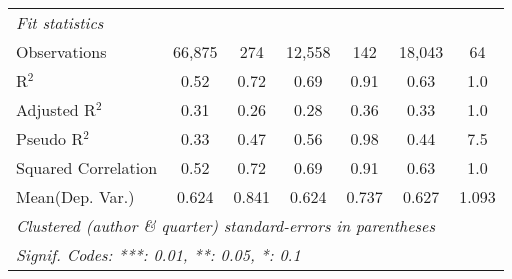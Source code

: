 \begin{tabular}{lcccccc}
   \midrule
   \emph{Fit statistics}\\
   Observations                                               & 66,875        & 274           & 12,558        & 142         & 18,043         & 64\\  
   R$^2$                                                      & 0.52          & 0.72          & 0.69          & 0.91        & 0.63           & 1.0\\  
   Adjusted R$^2$                                             & 0.31          & 0.26          & 0.28          & 0.36        & 0.33           & 1.0\\  
   Pseudo R$^2$                                               & 0.33          & 0.47          & 0.56          & 0.98        & 0.44           & 7.5\\  
   Squared Correlation                                        & 0.52          & 0.72          & 0.69          & 0.91        & 0.63           & 1.0\\  
Mean(Dep. Var.) & 0.624 & 0.841 & 0.624 & 0.737 & 0.627 & 1.093 \\
   \midrule \midrule
   \multicolumn{7}{l}{\emph{Clustered (author \& quarter) standard-errors in parentheses}}\\
   \multicolumn{7}{l}{\emph{Signif. Codes: ***: 0.01, **: 0.05, *: 0.1}}\\
\end{tabular}
\par\endgroup
